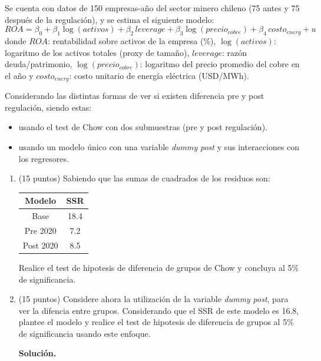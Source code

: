 \documentclass[10pt,a4paper]{article}
\begin{document}
\begin{enumerate}
Se cuenta con datos de 150 empresas-año del sector minero chileno (75 antes y 75 después de la regulación), y se estima el siguiente modelo:
\[
ROA = \beta_0 + \beta_1 \log(activos) + \beta_2 \, leverage + \beta_3 \log(precio_{cobre}) + \beta_4 \, costo_{energ} + u
\]
donde $ROA$: rentabilidad sobre activos de la empresa (\%), $\log(activos)$: logaritmo de los activos totales (proxy de tamaño), $leverage$: razón deuda/patrimonio, $\log(precio_{cobre})$: logaritmo del precio promedio del cobre en el año y $costo_{energ}$: costo unitario de energía eléctrica (USD/MWh).

Considerando las distintas formas de ver si existen diferencia pre y post regulación, siendo estas:
    \begin{itemize}
        \item usando el test de Chow con dos submuestras (pre y post regulación).
        \item usando un modelo único con una variable \textit{dummy} \textit{post} y sus interacciones con los regresores.
    \end{itemize}

\begin{enumerate}    
    \item[(b)] (15 puntos) Sabiendo que las sumas de cuadrados de los residuos son:
    \begin{table}[H]
        \centering
        \begin{tabular}{|c|c|}
            \hline
            Modelo & SSR \\
            \hline
            Base &  18.4 \\
            Pre 2020 & 7.2 \\
            Post 2020 & 8.5 \\
            \hline
        \end{tabular}
        \label{tab:placeholder}
    \end{table}

    Realice el test de hipotesis de diferencia de grupos de Chow y concluya al 5\% de significancia.
    
    \item[(c)] (15 puntos) Considere ahora la utilización de la variable \textit{dummy} \textit{post}, para ver la difencia entre grupos. Considerando que el SSR de este modelo es 16.8, plantee el modelo y realice el test de hipotesis de diferencia de grupos al 5\% de significancia usando este enfoque. 

    
\textbf{Solución.}


\end{enumerate}
\end{enumerate}
\end{document}

